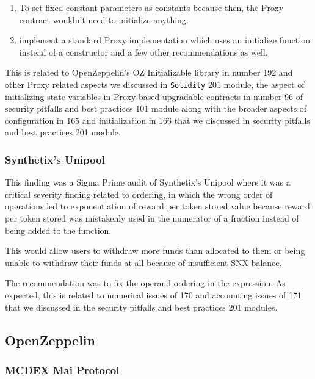 \begin{enumerate}
\def\labelenumi{\arabic{enumi}.}
\tightlist
\item
  To set fixed constant parameters as constants because then, the Proxy
  contract wouldn't need to initialize anything.
\item
  implement a standard Proxy implementation which uses an initialize
  function instead of a constructor and a few other recommendations as
  well.
\end{enumerate}

This is related to OpenZeppelin's OZ Initializable library in number 192
and other Proxy related aspects we discussed in \texttt{Solidity} 201
module, the aspect of initializing state variables in Proxy-based
upgradable contracts in number 96 of security pitfalls and best
practices 101 module along with the broader aspects of configuration in
165 and initialization in 166 that we discussed in security pitfalls and
best practices 201 module.

\subsubsection{Synthetix's Unipool}\label{synthetixs-unipool}

This finding was a Sigma Prime audit of Synthetix's Unipool where it was
a critical severity finding related to ordering, in which the wrong
order of operations led to exponentiation of reward per token stored
value because reward per token stored was mistakenly used in the
numerator of a fraction instead of being added to the function.

This would allow users to withdraw more funds than allocated to them or
being unable to withdraw their funds at all because of insufficient SNX
balance.

The recommendation was to fix the operand ordering in the expression. As
expected, this is related to numerical issues of 170 and accounting
issues of 171 that we discussed in the security pitfalls and best
practices 201 modules.

\subsection{OpenZeppelin}\label{openzeppelin}

\subsubsection{MCDEX Mai Protocol}\label{mcdex-mai-protocol}

